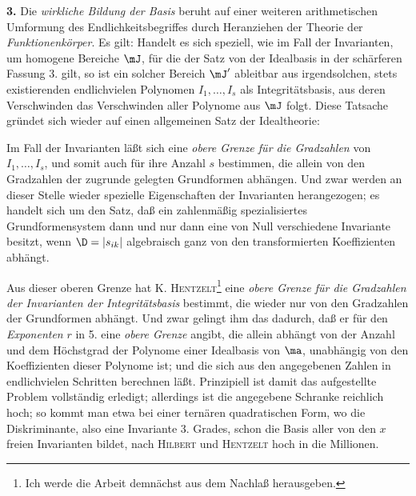 \textbf{3.} Die \emph{wirkliche Bildung der Basis} beruht auf einer weiteren arithmetischen Umformung des Endlichkeitsbegriffes durch Heranziehen der Theorie der \emph{Funktionenkörper}. Es gilt:
Handelt es sich speziell, wie im Fall der Invarianten, um homogene Bereiche $\mJ$, für die der Satz von der Idealbasis in der schärferen Fassung 3. gilt, so ist ein solcher Bereich $\mJ'$ ableitbar aus irgendsolchen, stets existierenden endlichvielen Polynomen $I_1,\ldots,I_s$ als Integritätsbasis, aus deren Verschwinden das Verschwinden aller Polynome aus $\mJ$ folgt. Diese Tatsache gründet sich wieder auf einen allgemeinen Satz der Idealtheorie:

Im Fall der Invarianten läßt sich eine \emph{obere Grenze für die Gradzahlen} von $I_1,\ldots,I_s$, und somit auch für ihre Anzahl $s$ bestimmen, die allein von den Gradzahlen der zugrunde gelegten Grundformen abhängen. Und zwar werden an dieser Stelle wieder spezielle Eigenschaften der Invarianten herangezogen; es handelt sich um den Satz, daß ein zahlenmäßig spezialisiertes Grundformensystem dann und nur dann eine von Null verschiedene Invariante besitzt, wenn $\D=|s_{ik}|$ algebraisch ganz von den transformierten Koeffizienten abhängt.

Aus dieser oberen Grenze hat K. \textsc{Hentzelt}\footnote{Ich werde die Arbeit demnächst aus dem Nachlaß herausgeben.} eine \emph{obere Grenze für die Gradzahlen der Invarianten der Integritätsbasis} bestimmt, die wieder nur von den Gradzahlen der Grundformen abhängt. Und zwar gelingt ihm das dadurch, daß er für den \emph{Exponenten} $r$ in 5. eine \emph{obere Grenze} angibt, die allein abhängt von der Anzahl und dem Höchstgrad der Polynome einer Idealbasis von $\ma$, unabhängig von den Koeffizienten dieser Polynome ist; und die sich aus den angegebenen Zahlen in endlichvielen Schritten berechnen läßt. Prinzipiell ist damit das aufgestellte Problem vollständig erledigt; allerdings ist die angegebene Schranke reichlich hoch; so kommt man etwa bei einer ternären quadratischen Form, wo die Diskriminante, also eine Invariante 3. Grades, schon die Basis aller von den $x$ freien Invarianten bildet, nach \textsc{Hilbert} und \textsc{Hentzelt} hoch in die Millionen.

